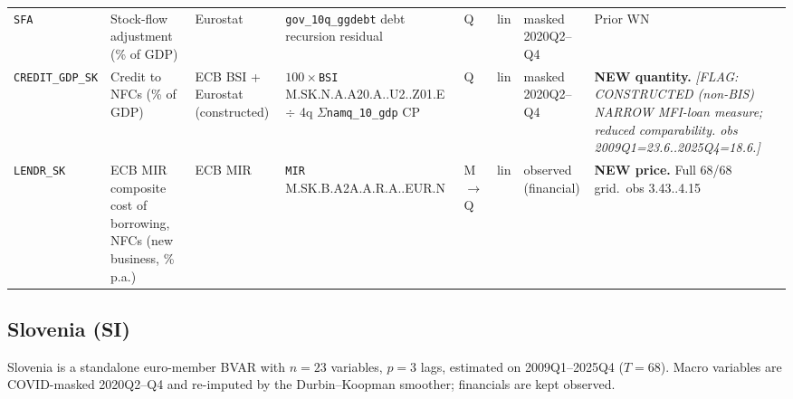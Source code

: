 {\begin{longtable}{@{}p{1.9cm}p{2.9cm}p{1.5cm}p{2.7cm}p{0.7cm}p{1.0cm}p{1.6cm}p{2.4cm}@{}}
\texttt{SFA}          & Stock-flow adjustment (\% of GDP) & Eurostat & \texttt{gov\_10q\_ggdebt} debt recursion residual      & Q & lin & masked 2020Q2--Q4 & Prior WN \\
\texttt{CREDIT\_GDP\_SK} & Credit to NFCs (\% of GDP)     & ECB BSI + Eurostat (constructed) & $100\times$\texttt{BSI} M.\allowbreak SK.\allowbreak N.\allowbreak A.\allowbreak A20.\allowbreak A.\allowbreak 1.\allowbreak U2.\allowbreak 2240.\allowbreak Z01.\allowbreak E $\div$ 4q $\Sigma$\texttt{namq\_10\_gdp} CP & Q & lin & masked 2020Q2--Q4 & \textbf{NEW quantity.} \textit{[FLAG: CONSTRUCTED (non-BIS) NARROW MFI-loan measure; reduced comparability. obs 2009Q1=23.6..2025Q4=18.6.]} \\
\texttt{LENDR\_SK}    & ECB MIR composite cost of borrowing, NFCs (new business, \% p.a.) & ECB MIR & \texttt{MIR} M.\allowbreak SK.\allowbreak B.\allowbreak A2A.\allowbreak A.\allowbreak R.\allowbreak A.\allowbreak 2240.\allowbreak EUR.\allowbreak N & M$\to$Q & lin & observed (financial) & \textbf{NEW price.} Full 68/68 grid.\ obs 3.43..4.15 \\
\end{longtable}}

\subsection{Slovenia (SI)}\label{sec:data:SI}
Slovenia is a standalone euro-member BVAR with $n=23$ variables,
$p=3$ lags, estimated on 2009Q1--2025Q4 ($T=68$).  Macro variables are
COVID-masked 2020Q2--Q4 and re-imputed by the Durbin--Koopman smoother;
financials are kept observed.

